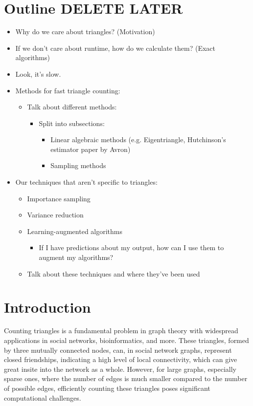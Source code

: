 \documentclass[12pt]{report}
\begin{document}
\section{Outline DELETE LATER}
\begin{itemize}
    \item Why do we care about triangles? (Motivation)
    \item If we don't care about runtime, how do we calculate them? (Exact algorithms)
    \item Look, it's slow.
    \item Methods for fast triangle counting:
    \begin{itemize}
        \item Talk about different methods:
        \begin{itemize}
            \item Split into subsections:
            \begin{itemize}
                \item Linear algebraic methods (e.g. Eigentriangle, Hutchinson's estimator paper by Avron)
                \item Sampling methods
            \end{itemize}
        \end{itemize}
    \end{itemize}
    \item Our techniques that aren't specific to triangles:
    \begin{itemize}
        \item Importance sampling
        \item Variance reduction
        \item Learning-augmented algorithms
        \begin{itemize}
            \item If I have predictions about my output, how can I use them to augment my algorithms?
        \end{itemize}
        \item Talk about these techniques and where they've been used
    \end{itemize}
\end{itemize}

\section{Introduction}

Counting triangles is a fundamental problem in graph theory with widespread applications in social networks, bioinformatics, and more.
These triangles, formed by three mutually connected nodes, can, in social network graphs, represent closed friendships, indicating a high level of local connectivity, which can give great insite into the network as a whole.
However, for large graphs, especially sparse ones, where the number of edges is much smaller compared to the number of possible edges, efficiently counting these triangles poses significant computational challenges.
\end{document}
